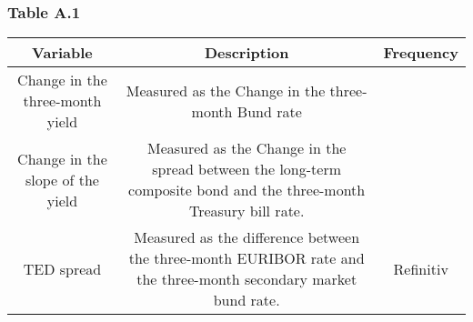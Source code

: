 \documentclass[
  10pt,
]{article}
\begin{document}
\hypertarget{table-a.1}{%
\subsubsection{Table A.1}\label{table-a.1}}

\begin{longtable}[]{@{}ccc@{}}
\toprule
\begin{minipage}[b]{0.36\columnwidth}\centering
Variable\strut
\end{minipage} & \begin{minipage}[b]{0.32\columnwidth}\centering
Description\strut
\end{minipage} & \begin{minipage}[b]{0.24\columnwidth}\centering
Frequency\strut
\end{minipage}\tabularnewline
\midrule
\endhead
\begin{minipage}[t]{0.36\columnwidth}\centering
Change in the three-month yield\strut
\end{minipage} & \begin{minipage}[t]{0.32\columnwidth}\centering
Measured as the Change in the three-month Bund rate\strut
\end{minipage} & \begin{minipage}[t]{0.24\columnwidth}\centering
\strut
\end{minipage}\tabularnewline
\begin{minipage}[t]{0.36\columnwidth}\centering
Change in the slope of the yield\strut
\end{minipage} & \begin{minipage}[t]{0.32\columnwidth}\centering
Measured as the Change in the spread between the long-term composite
bond and the three-month Treasury bill rate.\strut
\end{minipage} & \begin{minipage}[t]{0.24\columnwidth}\centering
\strut
\end{minipage}\tabularnewline
\begin{minipage}[t]{0.36\columnwidth}\centering
TED spread\strut
\end{minipage} & \begin{minipage}[t]{0.32\columnwidth}\centering
Measured as the difference between the three-month EURIBOR rate and the
three-month secondary market bund rate.\strut
\end{minipage} & \begin{minipage}[t]{0.24\columnwidth}\centering
Refinitiv\strut
\end{minipage}\tabularnewline

\end{longtable}
\end{document}
